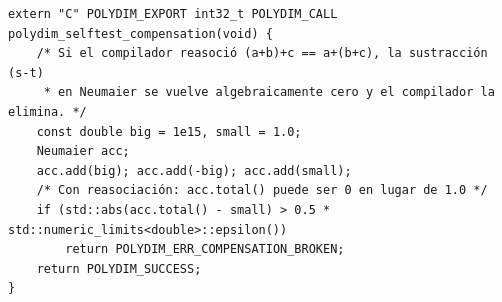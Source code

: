 \begin{lstlisting}[style=cppstyle, caption={Autodiagnóstico anti--ffast-math --- V764}, label=lst:selftest_full]
extern "C" POLYDIM_EXPORT int32_t POLYDIM_CALL polydim_selftest_compensation(void) {
    /* Si el compilador reasoció (a+b)+c == a+(b+c), la sustracción (s-t)
     * en Neumaier se vuelve algebraicamente cero y el compilador la elimina. */
    const double big = 1e15, small = 1.0;
    Neumaier acc;
    acc.add(big); acc.add(-big); acc.add(small);
    /* Con reasociación: acc.total() puede ser 0 en lugar de 1.0 */
    if (std::abs(acc.total() - small) > 0.5 * std::numeric_limits<double>::epsilon())
        return POLYDIM_ERR_COMPENSATION_BROKEN;
    return POLYDIM_SUCCESS;
}
\end{lstlisting}
